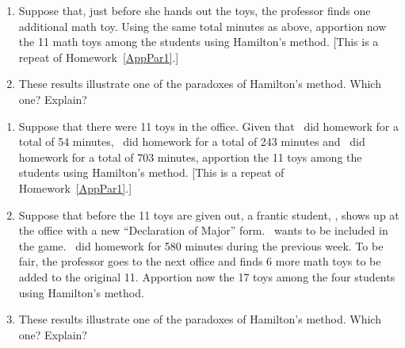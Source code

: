 \begin{Denumerate}
\begin{enumerate}
	\vfill
	\item Suppose that, just before she hands out the toys, the professor finds one additional math toy.  Using the same total minutes as above, apportion now the 11 math toys among the students using Hamilton's method.  [This is a repeat of Homework~\ref{AppPar1}.] 
	\vfill
	\item These results illustrate one of the paradoxes of Hamilton's method.  Which one?  Explain? 
	\vfill
	\end{enumerate}
	
	\hwnewpage
\item \begin{enumerate}
	\item Suppose that there were 11 toys in the office.  Given that \randstudent[1]\ did homework for a total of 54 minutes, \randstudent[2]\ did homework for a total of 243 minutes and \randstudent[3]\ did homework for a total of 703 minutes, apportion the 11 toys among the students using Hamilton's method.  [This is a repeat of Homework~\ref{AppPar1}.] 
	\vfill 
	\item Suppose that before the 11 toys are given out, a frantic student, \randstudent[4], shows up at the office with a new ``Declaration of Major'' form.  \randstudent[4]\ wants to be included in the game.  \randstudent[4]\ did homework for 580 minutes during the previous week.  To be fair, the professor goes to the next office and finds 6 more math toys to be added to the original 11.  Apportion now the 17 toys among the four students using Hamilton's method. \vfill
		\item These results illustrate one of the paradoxes of Hamilton's method.  Which one?  Explain? 
	\vfill
	\end{enumerate}
	\hwnewpage
	

\end{Denumerate}
